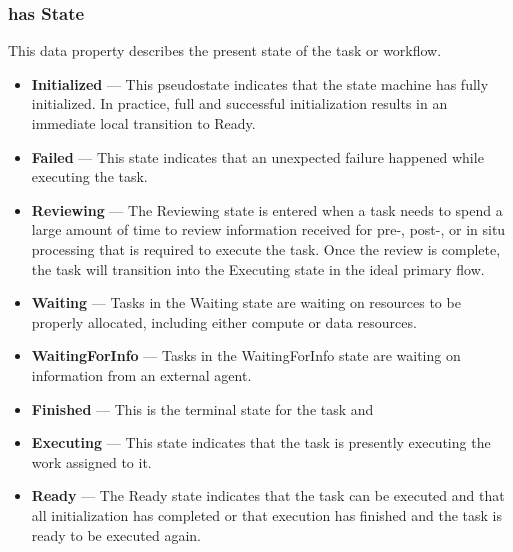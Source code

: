 \subsubsection{ has State } This data property describes the present state of
the task or workflow.
\begin{itemize}
  \item \textbf{Initialized} --- This pseudostate indicates that the state
  machine has fully initialized. In practice, full and successful
  initialization results in an immediate local transition to Ready.
  \item \textbf{Failed} --- This state indicates that an unexpected failure
  happened while executing the task.
  \item \textbf{Reviewing} --- The Reviewing state is entered when a task
  needs to spend a large amount of time to review information received for
  pre-, post-, or in situ processing that is required to execute the task.
  Once the review is complete, the task will transition into the Executing
  state in the ideal primary flow.
  \item \textbf{Waiting} --- Tasks in the Waiting state are waiting on
  resources to be properly allocated, including either compute or data
  resources.
  \item \textbf{WaitingForInfo} --- Tasks in the WaitingForInfo state are
  waiting on information from an external agent.
  \item \textbf{Finished} --- This is the terminal state for the task and
  \item \textbf{Executing} --- This state indicates that the task is presently
  executing the work assigned to it.
  \item \textbf{Ready} --- The Ready state indicates that the task can be
  executed and that all initialization has completed or that execution has
  finished and the task is ready to be executed again.
\end{itemize}